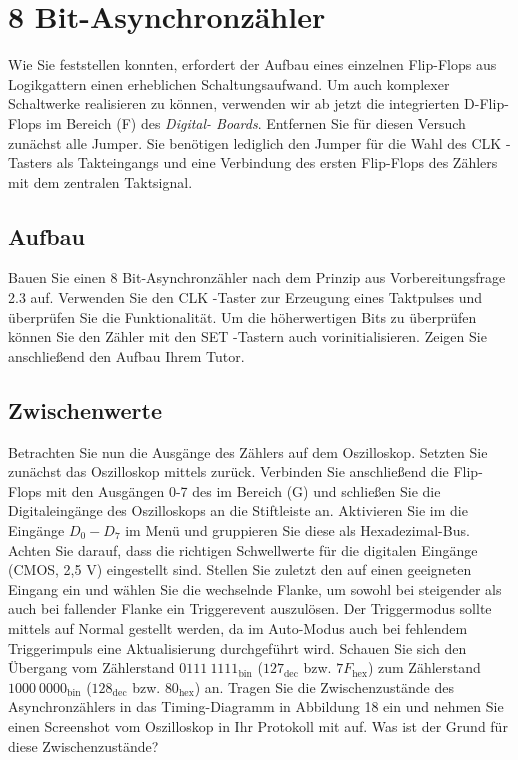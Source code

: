 \documentclass[10pt]{scrreprt}
\begin{document}
    \section{8 Bit-Asynchronzähler}
    Wie Sie feststellen konnten, erfordert der Aufbau eines einzelnen Flip-Flops aus Logikgattern
    einen erheblichen Schaltungsaufwand. Um auch komplexer Schaltwerke realisieren zu
    können, verwenden wir ab jetzt die integrierten D-Flip-Flops im Bereich (F) des \textit{Digital-
    Boards}. Entfernen Sie für diesen Versuch zunächst alle Jumper. Sie benötigen lediglich
    den Jumper für die Wahl des CLK -Tasters als Takteingangs und eine Verbindung des
    ersten Flip-Flops des Zählers mit dem zentralen Taktsignal.

    \subsection{Aufbau}
    Bauen Sie einen 8 Bit-Asynchronzähler nach dem Prinzip aus Vorbereitungsfrage 2.3 auf.
    Verwenden Sie den CLK -Taster zur Erzeugung eines Taktpulses und überprüfen Sie die
    Funktionalität. Um die höherwertigen Bits zu überprüfen können Sie den Zähler mit den
    SET -Tastern auch vorinitialisieren. Zeigen Sie anschließend den Aufbau Ihrem Tutor.

    \subsection{Zwischenwerte}
    Betrachten Sie nun die Ausgänge des Zählers auf dem Oszilloskop. Setzten Sie zunächst
    das Oszilloskop mittels  zurück. Verbinden Sie anschließend die Flip-Flops
    mit den Ausgängen 0-7 des im Bereich (G) und schließen Sie die Digitaleingänge des
    Oszilloskops an die Stiftleiste an. Aktivieren Sie im die Eingänge $D_0 -D_7$ im 
    Menü und gruppieren Sie diese als Hexadezimal-Bus. Achten Sie darauf, dass die richtigen
    Schwellwerte für die digitalen Eingänge (CMOS, 2,5 V) eingestellt sind. Stellen Sie zuletzt
    den  auf einen geeigneten Eingang ein und wählen Sie die wechselnde Flanke,
    um sowohl bei steigender als auch bei fallender Flanke ein Triggerevent auszulösen. Der
    Triggermodus sollte mittels  auf Normal gestellt werden, da im
    Auto-Modus auch bei fehlendem Triggerimpuls eine Aktualisierung durchgeführt wird.
    Schauen Sie sich den Übergang vom Zählerstand $0111\ 1111_\text{bin}$ ($127_\text{dec}$ bzw. $7F_\text{hex}$) zum
    Zählerstand $1000\ 0000_\text{bin}$ ($128_\text{dec}$ bzw. $80_\text{hex}$) an. Tragen Sie die Zwischenzustände des
    Asynchronzählers in das Timing-Diagramm in Abbildung 18 ein und nehmen Sie einen
    Screenshot vom Oszilloskop in Ihr Protokoll mit auf. Was ist der Grund für diese
    Zwischenzustände?
\end{document}
